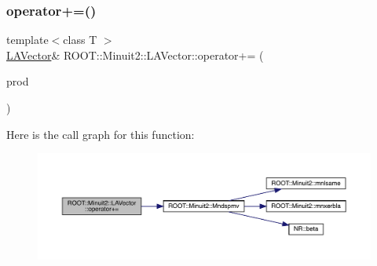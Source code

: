 \subsubsection{\texorpdfstring{operator+=()}{operator+=()}\hspace{0.1cm}{\footnotesize\ttfamily [11/12]}}
{\footnotesize\ttfamily template$<$class T $>$ \\
\mbox{\hyperlink{classROOT_1_1Minuit2_1_1LAVector}{L\+A\+Vector}}\& R\+O\+O\+T\+::\+Minuit2\+::\+L\+A\+Vector\+::operator+= (\begin{DoxyParamCaption}\item[{const \mbox{\hyperlink{classROOT_1_1Minuit2_1_1ABObj}{A\+B\+Obj}}$<$ \mbox{\hyperlink{classROOT_1_1Minuit2_1_1vec}{vec}}, \mbox{\hyperlink{classROOT_1_1Minuit2_1_1ABProd}{A\+B\+Prod}}$<$ \mbox{\hyperlink{classROOT_1_1Minuit2_1_1ABObj}{A\+B\+Obj}}$<$ \mbox{\hyperlink{classROOT_1_1Minuit2_1_1sym}{sym}}, \mbox{\hyperlink{classROOT_1_1Minuit2_1_1LASymMatrix}{L\+A\+Sym\+Matrix}}, T $>$, \mbox{\hyperlink{classROOT_1_1Minuit2_1_1ABObj}{A\+B\+Obj}}$<$ \mbox{\hyperlink{classROOT_1_1Minuit2_1_1vec}{vec}}, \mbox{\hyperlink{classROOT_1_1Minuit2_1_1LAVector}{L\+A\+Vector}}, T $>$ $>$, T $>$ \&}]{prod }\end{DoxyParamCaption})\hspace{0.3cm}{\ttfamily [inline]}}

Here is the call graph for this function\+:
\nopagebreak
\begin{figure}[H]
\begin{center}
\leavevmode
\includegraphics[width=350pt]{d3/d20/classROOT_1_1Minuit2_1_1LAVector_a4372064902da0f6b7028c1da17612825_cgraph}
\end{center}
\end{figure}
\mbox{\label{classROOT_1_1Minuit2_1_1LAVector_a4372064902da0f6b7028c1da17612825}} 
